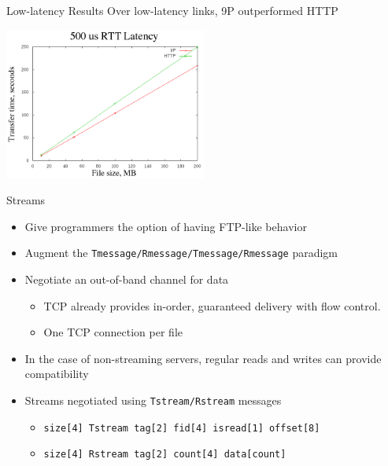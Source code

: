 \documentclass[11pt,compress]{beamer}
\begin{document}
\begin{frame}{Low-latency Results}
Over low-latency links, 9P outperformed HTTP
\begin{center}
\includegraphics[width=0.5\textwidth]{500us.png}
\end{center}
\end{frame}

\begin{frame}{Streams}
\begin{itemize}
	\item Give programmers the option of having FTP-like behavior
	\item Augment the {\tt Tmessage/Rmessage/Tmessage/Rmessage} paradigm
	\item Negotiate an out-of-band channel for data
	\begin{itemize}
		\item TCP already provides in-order, guaranteed delivery with flow control.
		\item One TCP connection per file
	\end{itemize}
	\item In the case of non-streaming servers, regular reads and writes can provide compatibility
	\item Streams negotiated using {\tt Tstream/Rstream} messages
	\begin{itemize}
		\item {\tt size[4] Tstream tag[2] fid[4] isread[1] offset[8]}
		\item {\tt size[4] Rstream tag[2] count[4] data[count]}
	\end{itemize}
\end{itemize}
\end{frame}
\end{document}
